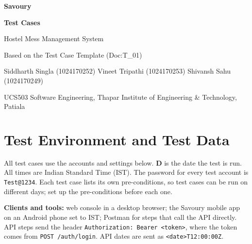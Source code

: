 \documentclass[11pt]{article}
\begin{document}
\thispagestyle{empty}
\begin{center}
  \vspace*{2.5cm}
  {\fontsize{40}{48}\selectfont\bfseries Savoury\par}
  \vspace{0.6cm}
  {\fontsize{30}{36}\selectfont\bfseries Test Cases\par}
  \vspace{0.8cm}
  {\Large Hostel Mess Management System\par}
  \vspace{0.4cm}
  {\large Based on the Test Case Template (Doc:T\_01)\par}
  \vspace{1.5cm}
  {\large Siddharth Singla (1024170252) \quad
   Vineet Tripathi (1024170253) \quad
   Shivansh Sahu (1024170249)\par}
  \vspace{0.5cm}
  {\large UCS503 Software Engineering, Thapar Institute of Engineering \& Technology, Patiala\par}
\end{center}

\clearpage
\section*{Test Environment and Test Data}

All test cases use the accounts and settings below. \textbf{D} is the date the
test is run. All times are Indian Standard Time (IST). The password for every
test account is \texttt{Test@1234}. Each test case lists its own
pre-conditions, so test cases can be run on different days; set up the
pre-conditions before each one.

\medskip
\textbf{Clients and tools:} web console in a desktop browser; the Savoury
mobile app on an Android phone set to IST; Postman for steps that call the API
directly. API steps send the header \texttt{Authorization: Bearer <token>}, where
the token comes from \texttt{POST /auth/login}. API dates are sent as
\texttt{<date>T12:00:00Z}.
\end{document}
